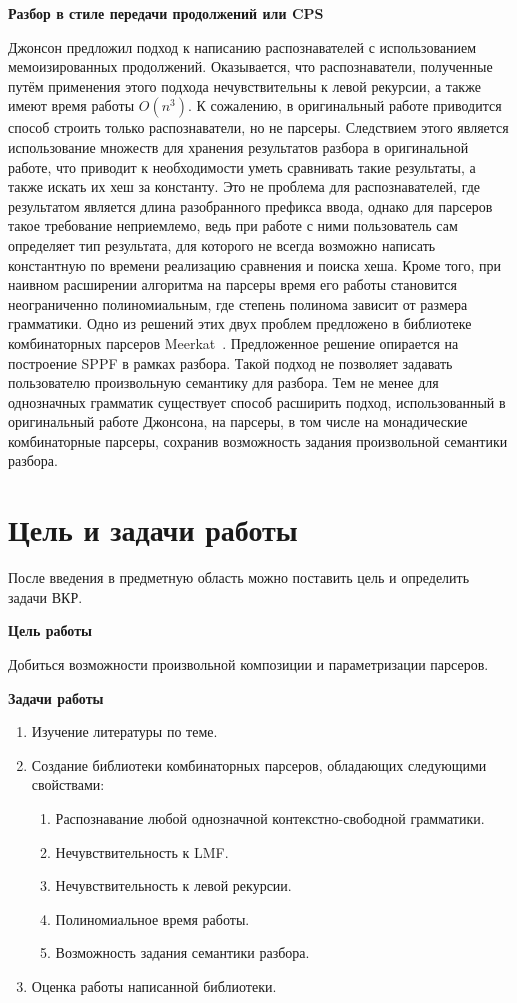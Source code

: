 \documentclass[times]{itmo-student-thesis}
\begin{document}
\textbf{Разбор в стиле передачи продолжений или CPS}~\cite{johnson_memoization_1995}

Джонсон предложил подход к написанию распознавателей с использованием мемоизированных продолжений. Оказывается, что
распознаватели, полученные путём   применения этого подхода нечувствительны к левой рекурсии, а также имеют время
работы $O(n^3)$. К сожалению, в оригинальный работе приводится способ строить только распознаватели, но не
парсеры. Следствием этого является использование множеств для хранения результатов разбора в оригинальной работе, что
приводит к необходимости уметь сравнивать такие результаты, а также искать их хеш за константу. Это не проблема для
распознавателей, где результатом является длина разобранного префикса ввода, однако для парсеров такое требование
неприемлемо, ведь при работе с ними пользователь сам определяет тип результата, для которого не всегда возможно
написать константную по времени реализацию сравнения и поиска хеша. Кроме того, при наивном расширении алгоритма на
парсеры время его работы становится неограниченно полиномиальным, где степень полинома зависит от размера грамматики.
Одно из решений этих двух проблем предложено в библиотеке комбинаторных парсеров Meerkat~\cite{izmaylova_practical_2016}.
Предложенное решение опирается на построение SPPF в рамках разбора. Такой подход не позволяет задавать пользователю
произвольную семантику для разбора. Тем не менее для однозначных грамматик существует способ расширить подход,
использованный в оригинальный работе Джонсона, на парсеры, в том числе на монадические комбинаторные парсеры, сохранив
возможность задания произвольной семантики разбора.

\section{Цель и задачи работы}\label{sec:goal_and_objectives}

После введения в предметную область можно поставить цель и определить задачи ВКР.

\textbf{Цель работы}

Добиться возможности произвольной композиции и параметризации парсеров.

\textbf{Задачи работы}

\begin{enumerate}
  \item Изучение литературы по теме.
  \item Создание библиотеки комбинаторных парсеров, обладающих следующими свойствами:
    \begin{enumerate}
        \item Распознавание любой однозначной контекстно-свободной грамматики.
        \item Нечувствительность к LMF.
        \item Нечувствительность к левой рекурсии.
        \item Полиномиальное время работы.
        \item Возможность задания семантики разбора.
    \end{enumerate}
  \item Оценка работы написанной библиотеки.
\end{enumerate}
\end{document}

